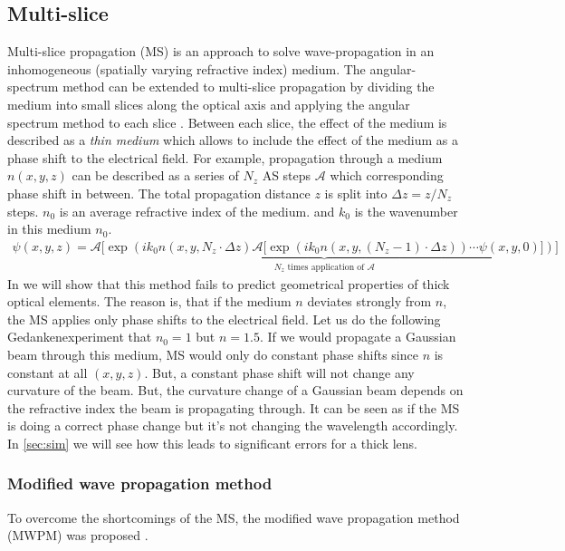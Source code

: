 \documentclass[a4paper,12pt]{article}
\begin{document}
\subsection{Multi-slice}
Multi-slice propagation (MS) is an approach to solve wave-propagation in an inhomogeneous (spatially varying refractive index) medium. 
The angular-spectrum method can be extended to multi-slice propagation by dividing the medium into small slices along the optical axis and applying the angular spectrum method to each slice \cite{https://doi.org/10.1107/S0365110X57002194,Li_Wojcik_Jacobsen_2017}. Between each slice, the effect of the medium is 
described as a \textit{thin medium} which allows to include the effect of the medium as a phase shift to the electrical field.
For example, propagation through a medium $n(x,y,z)$ can be described as a series of $N_z$ AS steps $\mathcal{A}$ which corresponding phase shift in between.
The total propagation distance $z$ is split into $\Delta z = z / N_z$ steps.
$n_0$ is an average refractive index of the medium. and $k_0$ is the wavenumber in this medium $n_0$.
\begin{align}
    \psi(x,y,z) = \underbrace{\mathcal{A}\bigg[\exp\left(i k_0 n(x,y, N_z \cdot \Delta z)\mathcal{A}\big[\exp\left(i k_0 n(x,y, (N_z - 1) \cdot \Delta z) \right) \cdots \psi(x,y, 0) \big] \right) \bigg]}_{N_z \text{ times application of }\mathcal{A}} 
\end{align}
In \label{sec:sim} we will show that this method fails to predict geometrical properties of thick optical elements.
The reason is, that if the medium $n$ deviates strongly from $n$, the MS applies only phase shifts to the electrical field.
Let us do the following Gedankenexperiment that $n_0 = 1$ but $n=1.5$. If we would
propagate a Gaussian beam through this medium, MS would only do constant phase shifts since $n$ is constant at all $(x,y,z)$. But, a constant phase shift will not change any curvature of the beam. But, the curvature change of a Gaussian beam depends on the refractive index the beam is propagating through. It can be seen as if the MS is doing a correct phase change but it's not changing the wavelength accordingly. 
In \autoref{sec:sim} we will see how this leads to significant errors for a thick lens.

\subsubsection{Modified wave propagation method}
To overcome the shortcomings of the MS, the modified wave propagation method (MWPM) was proposed \cite{schmidt2016wave}.
\end{document}
